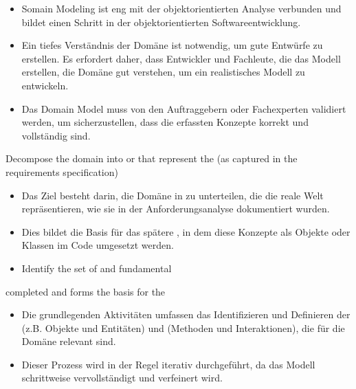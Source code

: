 \begin{infoBox}[title=Kontext und Ziele des objektorientierten Domain Modeling]
    \begin{itemize}
        \item {} Somain Modeling ist eng mit der objektorientierten Analyse verbunden und bildet einen Schritt in der objektorientierten Softwareentwicklung.
        \item {} Ein tiefes Verständnis der Domäne ist notwendig, um gute Entwürfe zu erstellen. Es erfordert daher, dass Entwickler und Fachleute, die das Modell erstellen, die Domäne gut verstehen, um ein realistisches Modell zu entwickeln.
        \item {} Das Domain Model muss von den Auftraggebern oder Fachexperten validiert werden, um sicherzustellen, dass die erfassten Konzepte korrekt und vollständig sind.
    \end{itemize}
\end{infoBox}
\begin{defBox}[title=Goal of an Object-Oriented Domain Model]
    Decompose the domain into  or  that represent the  (as captured in the requirements specification)
\end{defBox}
\begin{infoBox}[title=Ziel eines Objektorientierten Domain Models]
    \begin{itemize}
        \item Das Ziel besteht darin, die Domäne in  zu unterteilen, die die reale Welt repräsentieren, wie sie in der Anforderungsanalyse dokumentiert wurden.
        \item Dies bildet die Basis für das spätere , in dem diese Konzepte als Objekte oder Klassen im Code umgesetzt werden.
    \end{itemize}
\end{infoBox}
\begin{defBox}[title=How to create an Object-Oriented Domain Model]
    \begin{itemize}
        \item Identify the set of   and fundamental 
    \end{itemize}
     completed and forms the basis for the 
\end{defBox}
\begin{infoBox}[title=Erstellung eines objektorientierten Domain Models]
    \begin{itemize}
        \item Die grundlegenden Aktivitäten umfassen das Identifizieren und Definieren der  (z.B. Objekte und Entitäten) und  (Methoden und Interaktionen), die für die Domäne relevant sind.
        \item Dieser Prozess wird in der Regel iterativ durchgeführt, da das Modell schrittweise vervollständigt und verfeinert wird.
    \end{itemize}
\end{infoBox}
